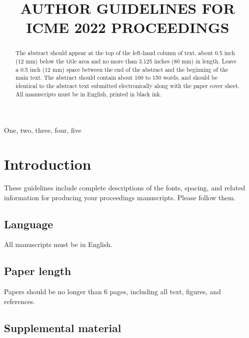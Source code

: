 \documentclass{article}
\begin{document}
\sloppy

\def\x{{\mathbf x}}
\def\L{{\cal L}}


\title{AUTHOR GUIDELINES FOR ICME 2022 PROCEEDINGS}
%
\address{}


\maketitle


%
\begin{abstract}
  The abstract should appear at the top of the left-hand column of text, about 0.5 inch (12 mm) below the title area and no more than 3.125 inches (80 mm) in length.  Leave a 0.5 inch (12 mm) space between the end of the abstract and the beginning of the main text.  The abstract should contain about 100 to 150 words, and should be identical to the abstract text submitted electronically along with the paper cover sheet.  All manuscripts must be in English, printed in black ink.
\end{abstract}
%
\begin{keywords}
  One, two, three, four, five
\end{keywords}
%
\section{Introduction}
\label{sec:intro}

These guidelines include complete descriptions of the fonts, spacing, and related information for producing your proceedings manuscripts. Please follow them.

\subsection{Language}

All manuscripts must be in English.

\subsection{Paper length}

Papers should be no longer than 6 pages, including all text, figures, and references.

\subsection{Supplemental material}
\end{document}

